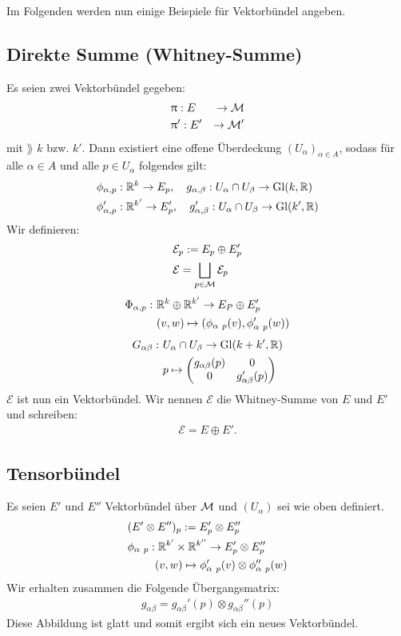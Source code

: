 Im Folgenden werden nun einige Beispiele für Vektorbündel angeben.
\subsection{Direkte Summe (Whitney-Summe)}
Es seien zwei Vektorbündel gegeben:
\begin{align*}
&\uppi : E &\to \mathcal{M} \\
&\uppi ' : E' & \to \mathcal{M} '
\end{align*}
mit $\rang$ $k$ bzw. $k'$. 
Dann existiert eine offene Überdeckung $(U_\alpha)_{\alpha \in A}$, sodass für alle $\alpha \in A$ und alle $p \in U_\alpha$ folgendes gilt:
\begin{align*}
&\phi_{\alpha, p}: \mathbb{R}^k \to E_p, \quad g_{\alpha, \beta}: U_\alpha \cap U_\beta \to \mathrm{Gl}(k, \mathbb{R})\\
&\phi_{\alpha, p}': \mathbb{R}^{k'} \to E_{p}', \quad g_{\alpha, \beta}': U_\alpha \cap U_\beta \to \mathrm{Gl}(k', \mathbb{R})
\end{align*}  
Wir definieren:
\begin{align*}
&\mathcal{E}_p := E_p \oplus E_{p}'\\
&\mathcal{E} = \bigsqcup_{p \in \mathcal{M}} \mathcal{E}_p
\end{align*}
\begin{align*}
\Phi_{\alpha, p}: \ &\mathbb{R}^k \oplus \mathbb{R}^{k'} \to E_P \oplus E_{p}'\\
&(v, w) \mapsto (\phi_{\alpha \ p} (v), \phi_{\alpha \ p}' (w))
\end{align*}
\begin{align*}
G_{\alpha \beta}: \ & U_\alpha \cap U_\beta \to \mathrm{Gl}(k + k', \mathbb{R})\\
&p \mapsto \begin{pmatrix}
g_{\alpha \beta}(p)  & 0 \\ 
0  & g_{\alpha \beta}'(p)
\end{pmatrix} 
\end{align*}
$\mathcal{E}$ ist nun ein Vektorbündel. 
Wir nennen $\mathcal{E}$ die Whitney-Summe von $E$ und $E'$ und schreiben:
\begin{align*}
\mathcal{E} = E \oplus E'.
\end{align*} 

\subsection{Tensorbündel}
Es seien $E'$ und $E''$ Vektorbündel über $\mathcal{M}$ und $(U_\alpha)$ sei wie oben definiert.
\begin{align*}
&(E' \otimes E'')_p := E_{p}'\otimes E_{p}''\\
&\phi_{\alpha \ p} :  \R^{k'} \times \R^{k''} \to E_{p}' \otimes E_{p}''\\
& \phantom{\phi_{\alpha \ p}: }(v, w) \mapsto \phi_{\alpha \ p}'(v) \otimes \phi_{\alpha \ p}'' (w)
\end{align*}
Wir erhalten zusammen die Folgende Übergangsmatrix:
\begin{align}
g_{\alpha \beta} = g_{\alpha \beta}'(p) \otimes g_{\alpha \beta}''(p)
\end{align}
Diese Abbildung ist glatt und somit ergibt sich ein neues Vektorbündel.

